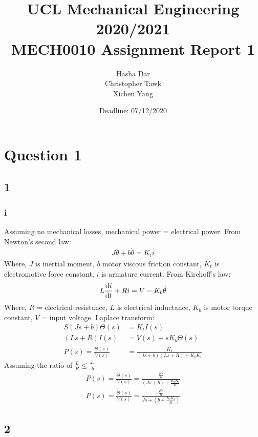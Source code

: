 \documentclass[11pt]{article}
\numberwithin{equation}{section}
\begin{document}
\title{\textbf{UCL Mechanical Engineering 2020/2021}\\MECH0010 Assignment Report 1}
\date{Deadline: 07/12/2020}
\author{Hasha Dar\\
Christopher Tawk\\
Xichen Yang}
\maketitle
\tableofcontents
\newpage
\section{Question 1}
\subsection{1}
\subsubsection{i}
Assuming no mechanical losses, mechanical power = electrical power. From Newton's second law:
\begin{align}
  J \ddot{\theta} + b\dot{\theta} = K_t i
\end{align}
Where, $J$ is inertial moment, $b$ motor viscous friction constant, $K_t$ is electromotive force constant, $i$ is armature current. From Kirchoff's law:
\begin{align}
  L \frac{\dif i}{\dif t} + Ri = V - K_b \dot{\theta}
\end{align}
Where, $R$ = electrical resistance, $L$ is electrical inductance, $K_b$ is motor torque constant, $V$ = input voltage. Laplace transform: 
\begin{align}
  S(Js + b)\Theta (s) &= K_t I(s)\\
  (Ls + R)I(s) &= V(s) - sK_b \Theta (s)\\
  P(s) = \frac{\dot{\Theta} (s)}{V(s)} &= \frac{K_t}{(Js +b)(Ls +R) + K_bK_t} 
\end{align}
Assuming the ratio of $\frac{L}{R} \leq \frac{J_m}{b}$
\begin{align}
  P(s) = \frac{\dot{\Theta}(s)}{V(s)} = \frac{\frac{K_t}{b}}{(Js + b) + \frac{K_b K_t}{R}}\\
  P(s) = \frac{\dot{\Theta}(s)}{V(s)} = \frac{\frac{K_t}{R}}{Js + \left(b + \frac{K_t K_b}{R}\right)}
\end{align}
\subsection{2}
\end{document}
